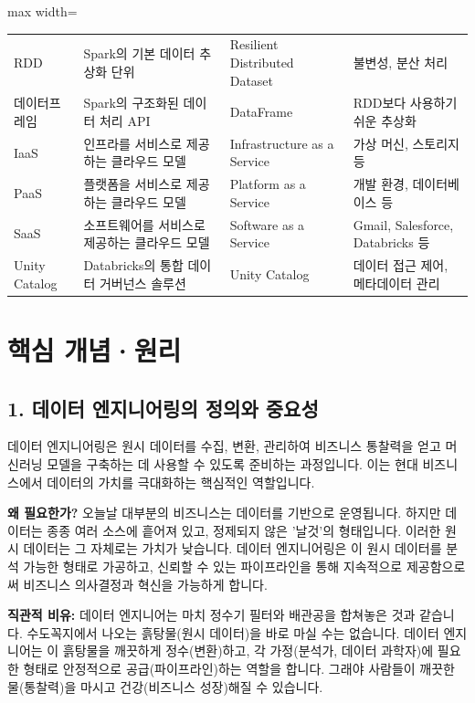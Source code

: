 \documentclass[11pt,a4paper]{article}
\begin{document}
\begin{adjustbox}{max width=\textwidth}
\begin{tabular}{llll}
RDD & Spark의 기본 데이터 추상화 단위 & Resilient Distributed Dataset & 불변성, 분산 처리 \\
데이터프레임 & Spark의 구조화된 데이터 처리 API & DataFrame & RDD보다 사용하기 쉬운 추상화 \\
IaaS & 인프라를 서비스로 제공하는 클라우드 모델 & Infrastructure as a Service & 가상 머신, 스토리지 등 \\
PaaS & 플랫폼을 서비스로 제공하는 클라우드 모델 & Platform as a Service & 개발 환경, 데이터베이스 등 \\
SaaS & 소프트웨어를 서비스로 제공하는 클라우드 모델 & Software as a Service & Gmail, Salesforce, Databricks 등 \\
Unity Catalog & Databricks의 통합 데이터 거버넌스 솔루션 & Unity Catalog & 데이터 접근 제어, 메타데이터 관리 \\
\bottomrule
\end{tabular}
\end{adjustbox}

\newpage

\section*{핵심 개념·원리}

\subsection*{1. 데이터 엔지니어링의 정의와 중요성}

\begin{summarybox}
데이터 엔지니어링은 원시 데이터를 수집, 변환, 관리하여 비즈니스 통찰력을 얻고 머신러닝 모델을 구축하는 데 사용할 수 있도록 준비하는 과정입니다. 이는 현대 비즈니스에서 데이터의 가치를 극대화하는 핵심적인 역할입니다.
\end{summarybox}

\textbf{왜 필요한가?}
오늘날 대부분의 비즈니스는 데이터를 기반으로 운영됩니다. 하지만 데이터는 종종 여러 소스에 흩어져 있고, 정제되지 않은 '날것'의 형태입니다. 이러한 원시 데이터는 그 자체로는 가치가 낮습니다. 데이터 엔지니어링은 이 원시 데이터를 분석 가능한 형태로 가공하고, 신뢰할 수 있는 파이프라인을 통해 지속적으로 제공함으로써 비즈니스 의사결정과 혁신을 가능하게 합니다.

\textbf{직관적 비유:}
데이터 엔지니어는 마치 정수기 필터와 배관공을 합쳐놓은 것과 같습니다.
수도꼭지에서 나오는 흙탕물(원시 데이터)을 바로 마실 수는 없습니다.
데이터 엔지니어는 이 흙탕물을 깨끗하게 정수(변환)하고, 각 가정(분석가, 데이터 과학자)에 필요한 형태로 안정적으로 공급(파이프라인)하는 역할을 합니다. 그래야 사람들이 깨끗한 물(통찰력)을 마시고 건강(비즈니스 성장)해질 수 있습니다.
\end{document}
